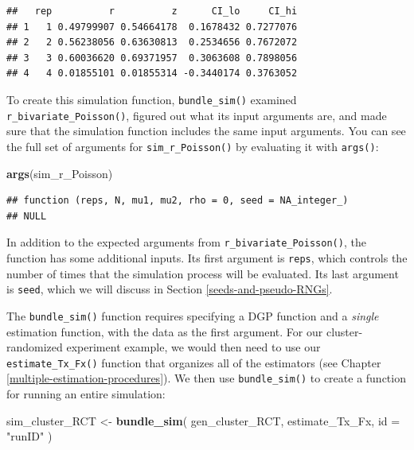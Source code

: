 \documentclass[
]{book}
\newenvironment{Shaded}{\begin{snugshade}}{\end{snugshade}}
\newcommand{\AttributeTok}[1]{\textcolor[rgb]{0.13,0.29,0.53}{#1}}
\newcommand{\FunctionTok}[1]{\textcolor[rgb]{0.13,0.29,0.53}{\textbf{#1}}}
\newcommand{\NormalTok}[1]{#1}
\newcommand{\OtherTok}[1]{\textcolor[rgb]{0.56,0.35,0.01}{#1}}
\newcommand{\StringTok}[1]{\textcolor[rgb]{0.31,0.60,0.02}{#1}}
\begin{document}
\begin{verbatim}
##   rep          r          z      CI_lo     CI_hi
## 1   1 0.49799907 0.54664178  0.1678432 0.7277076
## 2   2 0.56238056 0.63630813  0.2534656 0.7672072
## 3   3 0.60036620 0.69371957  0.3063608 0.7898056
## 4   4 0.01855101 0.01855314 -0.3440174 0.3763052
\end{verbatim}

To create this simulation function, \texttt{bundle\_sim()} examined \texttt{r\_bivariate\_Poisson()}, figured out what its input arguments are, and made sure that the simulation function includes the same input arguments.
You can see the full set of arguments for \texttt{sim\_r\_Poisson()} by evaluating it with \texttt{args()}:

\begin{Shaded}
\begin{Highlighting}[]
\FunctionTok{args}\NormalTok{(sim\_r\_Poisson)}
\end{Highlighting}
\end{Shaded}

\begin{verbatim}
## function (reps, N, mu1, mu2, rho = 0, seed = NA_integer_) 
## NULL
\end{verbatim}

In addition to the expected arguments from \texttt{r\_bivariate\_Poisson()}, the function has some additional inputs.
Its first argument is \texttt{reps}, which controls the number of times that the simulation process will be evaluated.
Its last argument is \texttt{seed}, which we will discuss in Section \ref{seeds-and-pseudo-RNGs}.

The \texttt{bundle\_sim()} function requires specifying a DGP function and a \emph{single} estimation function, with the data as the first argument.
For our cluster-randomized experiment example, we would then need to use our \texttt{estimate\_Tx\_Fx()} function that organizes all of the estimators (see Chapter \ref{multiple-estimation-procedures}).
We then use \texttt{bundle\_sim()} to create a function for running an entire simulation:

\begin{Shaded}
\begin{Highlighting}[]
\NormalTok{sim\_cluster\_RCT }\OtherTok{\textless{}{-}} \FunctionTok{bundle\_sim}\NormalTok{( gen\_cluster\_RCT, estimate\_Tx\_Fx, }\AttributeTok{id =} \StringTok{"runID"}\NormalTok{ )}
\end{Highlighting}
\end{Shaded}
\end{document}

